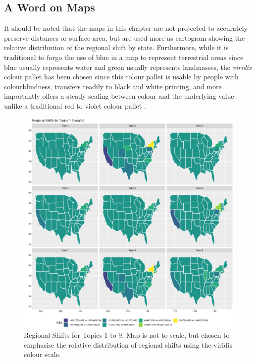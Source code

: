 \subsection{A Word on Maps}

It should be noted that the maps in this chapter are not projected to accurately preserve distances or surface area, but are used more as cartogram showing the relative distribution of the regional shift by state.  Furthermore, while it is traditional to forgo the use of blue in a map to represent terrestrial areas since blue usually represents water and green usually represents landmasses, the \textit{viridis} colour pallet has been chosen since this colour pallet is usable by people with colourblindness, transfers readily to black and white printing, and more importantly offers a steady scaling between colour and the underlying value unlike a traditional red to violet colour pallet \citep{viridis2018}.    

\begin{figure}
	\centering
	\includegraphics[width=1\linewidth]{Figures/ChapterV/States_01_09}
	\caption[Regional Shifts for Topics 1 to 9]{Regional Shifts for Topics 1 to 9.  Map is not to scale, but chosen to emphasise the relative distribution of regional shifts using the viridis colour scale.}
	\label{fig:states0109}
\end{figure}

